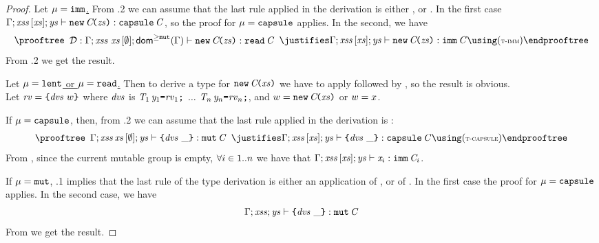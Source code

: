 {\begin{proof}
\medskip\noindent
Let \underline{$\mu=\texttt{imm}$.} From .2 we can assume that the last rule applied in the derivation is
either , or . 
In the first case
$\Gamma;\mathit{xss}\,[\mathit{xs}];\mathit{ys}\vdash {{\texttt{new}\,\mathit{C}\!\texttt{(}\mathit{zs}\texttt{)}}}:\texttt{capsule}\,\mathit{C}$, so the proof for $\mu=\texttt{capsule}$ applies.
In the second, we have 
\[
\prooftree
\begin{array}{c}
\deriv:\AuxTypeCheck{\Gamma}{\LentLocked\ \xs}{\emptyset}{\domGeqMut(\Gamma) }{{\ConstrCall{\C}{\zs}}}{\Type{\readable}{\C}}
\end{array}
\justifies
\AuxTypeCheck{\Gamma}{\LentLocked}{\MutGroup}{\StronglyLocked}{{{\ConstrCall{\C}{\zs}}}}{\Type{\imm}{\C}}
\using
\rn{t-imm}
\endprooftree
\]
From .2  we get the result. 

\medskip\noindent
Let \underline{$\mu=\texttt{lent}$ or $\mu=\texttt{read}$.} Then to derive a type for $\texttt{new}\,\mathit{C}\!\texttt{(}\mathit{xs}\texttt{)}$ we have
to apply  followed by , so the result is obvious.\\

\bigskip\noindent
Let \underline{$\mathit{rv}=\texttt{\{}\mathit{dvs}\ w\texttt{\}}$} where $\mathit{dvs}$ is 
$\mathit{T}_1\,\mathit{y}_1\texttt{=}\mathit{rv}_1\texttt{;}$ $\ldots$ $\mathit{T}_n\,\mathit{y}_n\texttt{=}\mathit{rv}_n\texttt{;}$, and  $w=\texttt{new}\,\mathit{C}\!\texttt{(}\mathit{xs}\texttt{)}$ or
$w=x$.  

\medskip\noindent
If \underline{$\mu=\texttt{capsule}$}, 
then, from .2 we can assume that the last rule applied in the derivation is
:
\[
\prooftree
\begin{array}{c}
\AuxTypeCheck{\Gamma}{\LentLocked\,\xs}{\emptyset}{\StronglyLocked}{\Block{\dvs}{\_}}{\Type{\mutable}{\C}}
\end{array}
\justifies
\AuxTypeCheck{\Gamma}{\LentLocked}{\MutGroup}{\StronglyLocked}{{{\Block{\dvs}{\_}}}}{\Type{\capsule}{\C}}
\using
\rn{t-capsule}
\endprooftree
\]
From , since the current mutable group is empty, 
$\forall i\in1..n$ we have that
$\Gamma;\mathit{xss}\,[\mathit{xs}];\mathit{ys}\vdash \mathit{x}_i:\texttt{imm}\,\mathit{C}_i$.


\medskip\noindent
If \underline{$\mu=\texttt{mut}$}, .1 implies that the last rule
of the type derivation is either an application of , or of .
In the first case  the proof for $\mu=\texttt{capsule}$ applies. In the second case, we have
\[
\Gamma;\mathit{xss};\mathit{ys}\vdash \texttt{\{}\mathit{dvs}\ \_\texttt{\}}:\texttt{mut}\,\mathit{C}
\]
From  we get the result.


\end{proof}}
